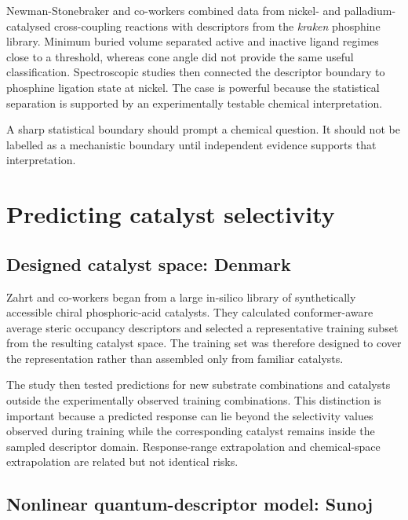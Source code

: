 Newman-Stonebraker and co-workers combined data from nickel- and palladium-catalysed cross-coupling reactions with descriptors from the \textit{kraken} phosphine library.
Minimum buried volume separated active and inactive ligand regimes close to a threshold, whereas cone angle did not provide the same useful classification.
Spectroscopic studies then connected the descriptor boundary to phosphine ligation state at nickel.
The case is powerful because the statistical separation is supported by an experimentally testable chemical interpretation.

\begin{warningbox}
  A sharp statistical boundary should prompt a chemical question.
  It should not be labelled as a mechanistic boundary until independent evidence supports that interpretation.
\end{warningbox}

\section{Predicting catalyst selectivity}

\subsection{Designed catalyst space: Denmark}

Zahrt and co-workers began from a large in-silico library of synthetically accessible chiral phosphoric-acid catalysts.
They calculated conformer-aware average steric occupancy descriptors and selected a representative training subset from the resulting catalyst space.
The training set was therefore designed to cover the representation rather than assembled only from familiar catalysts.

The study then tested predictions for new substrate combinations and catalysts outside the experimentally observed training combinations.
This distinction is important because a predicted response can lie beyond the selectivity values observed during training while the corresponding catalyst remains inside the sampled descriptor domain.
Response-range extrapolation and chemical-space extrapolation are related but not identical risks.

\subsection{Nonlinear quantum-descriptor model: Sunoj}

